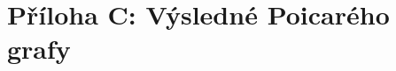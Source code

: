 


\clearpage



\clearpage

\section*{Příloha C: Výsledné Poicarého grafy}
\label{att:poincare_plots}

